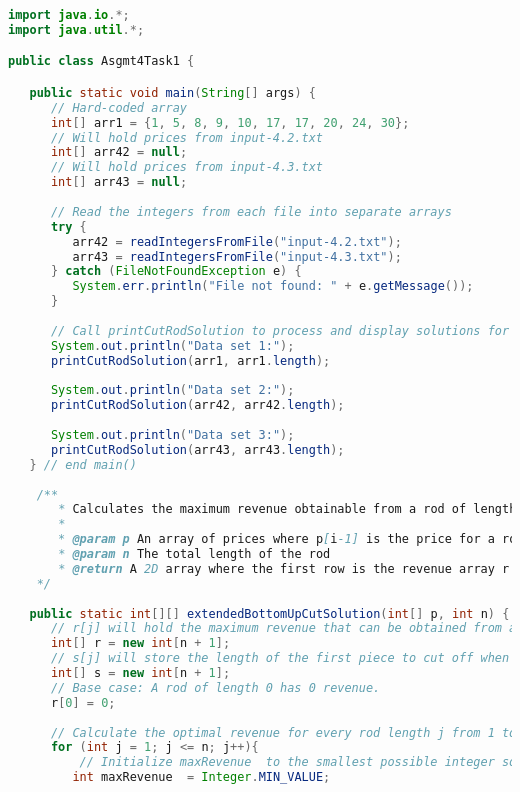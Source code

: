 \documentclass[11pt]{article}
\begin{document}
\begin{lstlisting}[language=Java]
import java.io.*;
import java.util.*;

public class Asgmt4Task1 {

   public static void main(String[] args) {
      // Hard-coded array
      int[] arr1 = {1, 5, 8, 9, 10, 17, 17, 20, 24, 30};
      // Will hold prices from input-4.2.txt
      int[] arr42 = null;
      // Will hold prices from input-4.3.txt
      int[] arr43 = null;
      
      // Read the integers from each file into separate arrays
      try {
         arr42 = readIntegersFromFile("input-4.2.txt");
         arr43 = readIntegersFromFile("input-4.3.txt");
      } catch (FileNotFoundException e) {
         System.err.println("File not found: " + e.getMessage());
      }
      
      // Call printCutRodSolution to process and display solutions for each set
      System.out.println("Data set 1:");
      printCutRodSolution(arr1, arr1.length);
      
      System.out.println("Data set 2:");
      printCutRodSolution(arr42, arr42.length);
      
      System.out.println("Data set 3:");
      printCutRodSolution(arr43, arr43.length);
   } // end main()
   
    /**
       * Calculates the maximum revenue obtainable from a rod of length n and the corresponding first-cut sizes that lead to that revenue
       *
       * @param p An array of prices where p[i-1] is the price for a rod of length i
       * @param n The total length of the rod
       * @return A 2D array where the first row is the revenue array r and the second row is the first cut array s
    */
   
   public static int[][] extendedBottomUpCutSolution(int[] p, int n) {
      // r[j] will hold the maximum revenue that can be obtained from a rod of length j.
      int[] r = new int[n + 1];
      // s[j] will store the length of the first piece to cut off when a rod of length j is optimally cut.
      int[] s = new int[n + 1];
      // Base case: A rod of length 0 has 0 revenue.
      r[0] = 0;
      
      // Calculate the optimal revenue for every rod length j from 1 to n
      for (int j = 1; j <= n; j++){
          // Initialize maxRevenue  to the smallest possible integer so any subsequent revenue is greater
         int maxRevenue  = Integer.MIN_VALUE;
         

\end{lstlisting}
\end{document}
